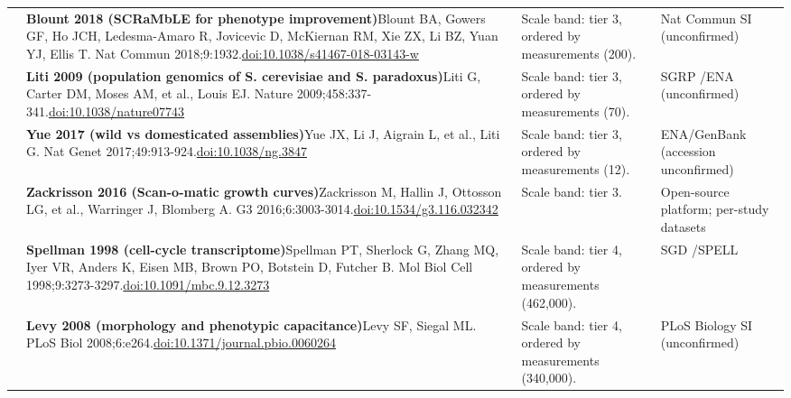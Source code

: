\begin{landscape}
\begin{longtable}{@{}r@{\hspace{4pt}} L{86mm} L{92mm} L{62mm}@{}}
 & \textbf{Blount 2018 (SCRaMbLE for phenotype improvement)}\newline Blount BA, Gowers GF, Ho JCH, Ledesma-Amaro R, Jovicevic D, McKiernan RM, Xie ZX, Li BZ, Yuan YJ, Ellis T. Nat Commun 2018;9:1932.\newline \href{https://doi.org/10.1038/s41467-018-03143-w}{doi:10.1038/\allowbreak s41467-018-03143-w} & Scale band: tier 3, ordered by measurements (200). & Nat Commun SI (unconfirmed) \\
 & \textbf{Liti 2009 (population genomics of S. cerevisiae and S. paradoxus)}\newline Liti G, Carter DM, Moses AM, et al., Louis EJ. Nature 2009;458:337-341.\newline \href{https://doi.org/10.1038/nature07743}{doi:10.1038/\allowbreak nature07743} & Scale band: tier 3, ordered by measurements (70). & SGRP /\allowbreak  ENA (unconfirmed) \\
 & \textbf{Yue 2017 (wild vs domesticated assemblies)}\newline Yue JX, Li J, Aigrain L, et al., Liti G. Nat Genet 2017;49:913-924.\newline \href{https://doi.org/10.1038/ng.3847}{doi:10.1038/\allowbreak ng.3847} & Scale band: tier 3, ordered by measurements (12). & ENA/\allowbreak GenBank (accession unconfirmed) \\
 & \textbf{Zackrisson 2016 (Scan-o-matic growth curves)}\newline Zackrisson M, Hallin J, Ottosson LG, et al., Warringer J, Blomberg A. G3 2016;6:3003-3014.\newline \href{https://doi.org/10.1534/g3.116.032342}{doi:10.1534/\allowbreak g3.116.032342} & Scale band: tier 3. & Open-source platform; per-study datasets \\
 & \textbf{Spellman 1998 (cell-cycle transcriptome)}\newline Spellman PT, Sherlock G, Zhang MQ, Iyer VR, Anders K, Eisen MB, Brown PO, Botstein D, Futcher B. Mol Biol Cell 1998;9:3273-3297.\newline \href{https://doi.org/10.1091/mbc.9.12.3273}{doi:10.1091/\allowbreak mbc.9.12.3273} & Scale band: tier 4, ordered by measurements (462,000). & SGD /\allowbreak  SPELL \\
 & \textbf{Levy 2008 (morphology and phenotypic capacitance)}\newline Levy SF, Siegal ML. PLoS Biol 2008;6:e264.\newline \href{https://doi.org/10.1371/journal.pbio.0060264}{doi:10.1371/\allowbreak journal.pbio.0060264} & Scale band: tier 4, ordered by measurements (340,000). & PLoS Biology SI (unconfirmed) \\

\end{longtable}
\end{landscape}
